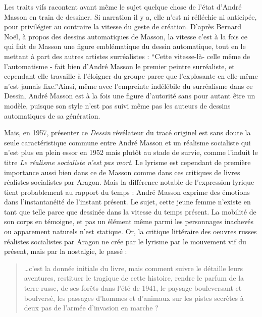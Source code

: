 {	Les traits vifs racontent avant même le sujet quelque chose de l’état d’André Masson en train de dessiner. Si narration il y a, elle n’est ni réfléchie ni anticipée, pour privilégier au contraire la vitesse du geste de création. D’après Bernard Noël, à propos des dessins automatiques de Masson, la vitesse c’est à la fois ce qui fait de Masson une figure emblématique du dessin automatique, tout en le mettant à part des autres artistes surréalistes : \enquote{Cette vitesse-là- celle même de l’automatisme - fait bien d’André Masson le premier peintre surréaliste, et cependant elle travaille à l’éloigner du groupe parce que l’explosante en elle-même n’est jamais fixe.}Ainsi, même avec l’empreinte indélébile du surréalisme dans ce Dessin, André Masson est à la fois une figure d’autorité sans pour autant être un modèle, puisque son style n’est pas suivi même pas les auteurs de dessins automatiques de sa génération. 

	Mais, en 1957, présenter ce \emph{Dessin} révélateur du tracé originel est sans doute la seule caractéristique commune entre André Masson et un réalisme socialiste qui n’est plus en plein essor en 1952 mais plutôt au stade de survie, comme l’induit le titre \emph{Le réalisme socialiste n’est pas mort}. Le lyrisme est cependant de première importance aussi bien dans ce  de Masson comme dans ces critiques de livres réalistes socialistes par Aragon. Mais la différence notable de l’expression lyrique tient probablement au rapport du temps : André Masson exprime des émotions dans l’instantanéité de l’instant présent. Le sujet, cette jeune femme n’existe en tant que telle parce que dessinée dans la vitesse du temps présent. La mobilité de son corps en témoigne, et pas un élément même parmi les personnages inachevés ou apparement naturels n’est statique. Or, la critique littéraire des oeuvres russes réalistes socialistes par Aragon ne crée par le lyrisme par le mouvement vif du présent, mais par la nostalgie, le passé : 

\begin{quote}
…c’est la donnée initiale du livre, mais comment suivre le détaille leurs aventures, restituer le tragique de cette histoire, rendre le parfum de la terre russe, de ses forêts dans l’été de 1941, le paysage bouleversant et boulversé, les passages d’hommes et d’animaux sur les pistes secrètes à deux pas de l’armée d’invasion en marche ?  	
\end{quote}	


}
